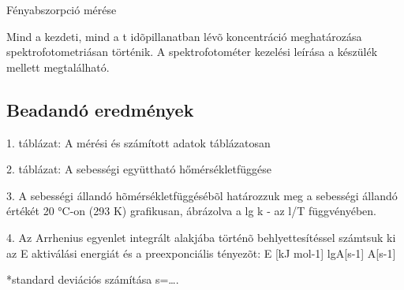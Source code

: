 \documentclass[a4paper, 12pt, twoside]{article}
\begin{document}
Fényabszorpció mérése


Mind a kezdeti, mind a t idõpillanatban lévõ koncentráció meghatározása spektrofotometriásan történik.
A spektrofotométer kezelési leírása a készülék mellett megtalálható.


\subsection{Beadandó eredmények}

1. táblázat: A mérési és számított adatok táblázatosan

2. táblázat: A sebességi együttható hőmérsékletfüggése

3. A sebességi állandó hõmérsékletfüggésébõl határozzuk meg a sebességi állandó értékét 20 °C-on (293 K) grafikusan, ábrázolva a lg k - az l/T függvényében.

4. Az Arrhenius egyenlet integrált alakjába történõ behlyettesítéssel számtsuk ki az E aktiválási energiát és a preexponciális tényezõt:
E [kJ mol-1]
lgA[s-1]
A[s-1]

*standard deviációs számítása
s=….
\end{document}
